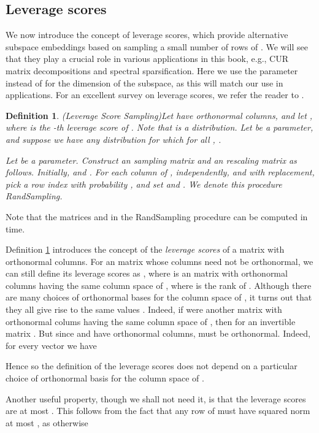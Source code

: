 \documentclass[11pt]{article}
\newtheorem{definition}[theorem]{Definition}
\begin{document}
\subsection{Leverage scores}\label{sec:leverage}
We now introduce the concept of leverage scores, which provide alternative subspace embeddings based on sampling
a small number of rows of . We will see that they play a crucial role in various applications in this book,
e.g., CUR matrix decompositions and spectral sparsification. Here we use the parameter  instead of  for the dimension
of the subspace, as this will match our use in applications. For an excellent survey on leverage scores, we refer
the reader to \cite{m11}. 

\begin{definition}(Leverage Score Sampling)\label{def:lss}
Let  have orthonormal columns, and let , 
where 
is the -th leverage score of . Note that  is a distribution. 
Let  be a parameter, and suppose we have any distribution  for which for
all , .

Let  be a parameter. Construct an  
sampling matrix  and an  rescaling matrix  as follows. 
Initially, 
and . For each column  of , 
independently, and with replacement, pick a row index
 with probability , and set  and 
. We denote this procedure
{\textsc RandSampling}. 
\end{definition}
Note that the matrices  and  in the {\textsc RandSampling} procedure 
can be computed in  time. 

Definition \ref{def:lss} introduces the concept of the {\it leverage scores}  of a matrix 
 with orthonormal columns. For an  matrix  whose columns need not be orthonormal, we can still
define its leverage scores  as , where  is an  matrix with orthonormal
columns having the same column space of , where  is the rank of . Although there are many choices
 of orthonormal bases for the column space of , it turns out that they all give rise to the same values
. Indeed, if  were another  matrix with orthonormal colums having the same column space
of , then  for an  invertible matrix . But since  and 
have orthonormal columns,  must be orthonormal. Indeed, for every vector  we have

Hence 
so the definition of the leverage scores does not depend on a particular choice of orthonormal basis for the column space
of .

Another useful property, though we shall not need it, is that the leverage scores  are at most . This follows
from the fact that any row  of  must have squared norm at most , as otherwise 
\end{document}
